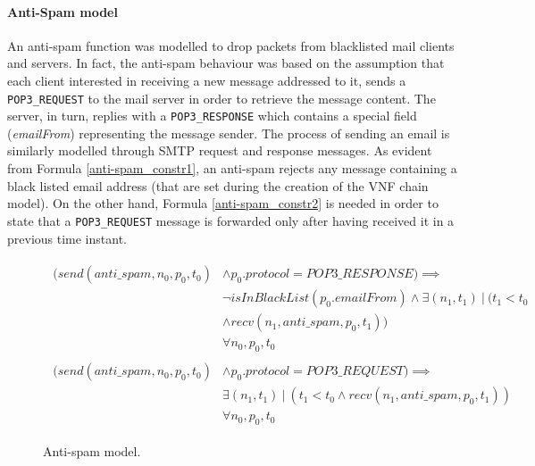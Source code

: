 \paragraph{Anti-Spam model}An anti-spam function was modelled to drop packets from blacklisted mail clients and servers. In fact, the anti-spam behaviour was based on the assumption that each client interested in receiving a new message addressed to it, sends a \texttt{POP3\_REQUEST} to the mail server in order to retrieve the message content. The server, in turn, replies with a \texttt{POP3\_RESPONSE} which contains a special field (\textit{emailFrom}) representing the message sender. The process of sending an email is similarly modelled through SMTP request and response messages. As evident from Formula \ref{anti-spam_constr1}, an anti-spam rejects any message containing a black listed email address (that are set during the creation of the VNF chain model). On the other hand, Formula \ref{anti-spam_constr2} is needed in order to state that a \texttt{POP3\_REQUEST} message is forwarded only after having received it in a previous time instant.
\begin{figure}[h]
	{\footnotesize
		\begin{subequations}
			\begin{align}
				\begin{split}
					\label{anti-spam_constr1}
					(send(anti\_spam, n_{0}, p_{0}, t_{0}) & \wedge p_{0}.protocol = POP3\_RESPONSE) \implies \\
					& \neg isInBlackList(p_{0}.emailFrom) \wedge \exists (n_{1}, t_{1}) \: | \: (t_{1} < t_{0} \\
					& \wedge recv(n_{1}, anti\_spam, p_{0}, t_{1})) \\
					& \forall n_{0}, p_{0}, t_{0}
				\end{split} \\
				\begin{split}
					\label{anti-spam_constr2}
					(send(anti\_spam, n_{0}, p_{0}, t_{0}) & \wedge p_{0}.protocol = POP3\_REQUEST) \implies \\
					& \exists (n_{1}, t_{1}) \: | \: (t_{1} < t_{0} \wedge recv(n_{1}, anti\_spam, p_{0}, t_{1})) \\
					& \forall n_{0}, p_{0}, t_{0}
				\end{split}
			\end{align}
		\end{subequations}
	}%
	\caption{Anti-spam model.}
	\label{anti-spam_model}
\end{figure}
